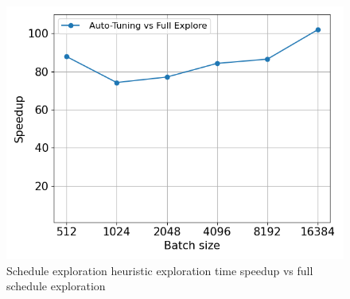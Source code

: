 \begin{figure}[htb]
  \centering
  \includegraphics[width=0.75\linewidth]{figures/geomean_speedup_4060_full_exp_vs_at.png}
  \caption{Schedule exploration heuristic exploration time speedup vs full schedule exploration}
  \label{Fig:HeuristicVsFullExplore_Speedup}
\end{figure}





